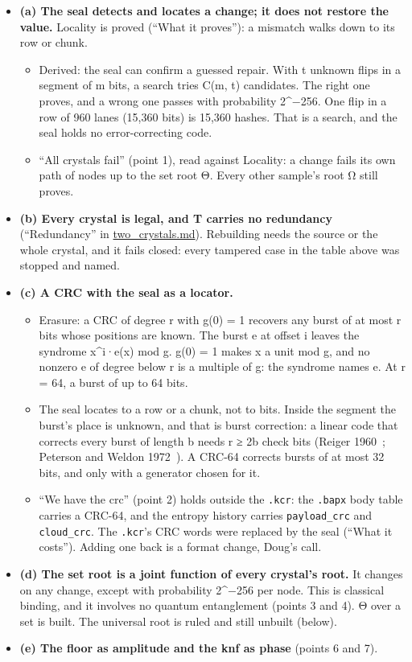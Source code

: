 \begin{itemize}
\item \textbf{(a) The seal detects and locates a change; it does not restore the value.} Locality is proved (“What it proves”): a mismatch walks down to its row or chunk.

\begin{itemize}
\item Derived: the seal can confirm a guessed repair. With t unknown flips in a segment of m bits, a search tries C(m, t) candidates. The right one proves, and a wrong one passes with probability 2\textasciicircum{}−256. One flip in a row of 960 lanes (15,360 bits) is 15,360 hashes. That is a search, and the seal holds no error-correcting code.
\item “All crystals fail” (point 1), read against Locality: a change fails its own path of nodes up to the set root Θ. Every other sample's root Ω still proves.
\end{itemize}
\item \textbf{(b) Every crystal is legal, and T carries no redundancy} (“Redundancy” in \hyperref[chap:two-crystals]{two\_\allowbreak{}crystals.md}). Rebuilding needs the source or the whole crystal, and it fails closed: every tampered case in the table above was stopped and named.
\item \textbf{(c) A CRC with the seal as a locator.}

\begin{itemize}
\item Erasure: a CRC of degree r with g(0) = 1 recovers any burst of at most r bits whose positions are known. The burst e at offset i leaves the syndrome x\textasciicircum{}i·e(x) mod g. g(0) = 1 makes x a unit mod g, and no nonzero e of degree below r is a multiple of g: the syndrome names e. At r = 64, a burst of up to 64 bits.
\item The seal locates to a row or a chunk, not to bits. Inside the segment the burst's place is unknown, and that is burst correction: a linear code that corrects every burst of length b needs r ≥ 2b check bits (Reiger 1960~\cite{src:Reiger-1960}; Peterson and Weldon 1972~\cite{src:Peterson-and-Weldon-1972}). A CRC-64 corrects bursts of at most 32 bits, and only with a generator chosen for it.
\item “We have the crc” (point 2) holds outside the \texttt{.\allowbreak{}kcr}: the \texttt{.\allowbreak{}bapx} body table carries a CRC-64, and the entropy history carries \texttt{payload\_\allowbreak{}crc} and \texttt{cloud\_\allowbreak{}crc}. The \texttt{.\allowbreak{}kcr}'s CRC words were replaced by the seal (“What it costs”). Adding one back is a format change, Doug's call.
\end{itemize}
\item \textbf{(d) The set root is a joint function of every crystal's root.} It changes on any change, except with probability 2\textasciicircum{}−256 per node. This is classical binding, and it involves no quantum entanglement (points 3 and 4). Θ over a set is built. The universal root is ruled and still unbuilt (below).
\item \textbf{(e) The floor as amplitude and the knf as phase} (points 6 and 7).


\end{itemize}
